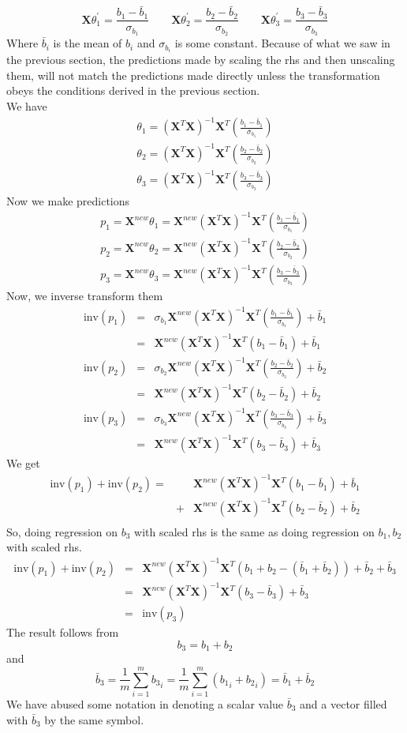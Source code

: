 \documentclass{article}
\newcommand{\beq}{\begin{equation}}
\newcommand{\eeq}{\end{equation}}
\newcommand{\ber}{\begin{eqnarray}}
\newcommand{\eer}{\end{eqnarray}}
\begin{document}
\beq
\pmb{X}\theta_1^{'}=\frac{b_1-\bar{b}_1}{\sigma_{b_1}} \qquad \pmb{X}\theta_2^{'}=\frac{b_2-\bar{b}_2}{\sigma_{b_2}} \qquad \pmb{X}\theta_3^{'}=\frac{b_3-\bar{b}_3}{\sigma_{b_3}}
\eeq
Where $\bar{b}_i$ is the mean of $b_i$ and $\sigma_{b_i}$ is some constant. Because of what we saw in the previous section, the predictions made by scaling the rhs and then unscaling them, will not match the predictions made directly unless the transformation obeys the conditions derived in the previous section.\\
We have
\ber
\theta_1 = (\pmb{X}^T\pmb{X})^{-1}\pmb{X}^T (\frac{b_1-\bar{b}_1}{\sigma_{b_1}})\\
\theta_2 = (\pmb{X}^T\pmb{X})^{-1}\pmb{X}^T (\frac{b_2-\bar{b}_2}{\sigma_{b_2}})\\
\theta_3 = (\pmb{X}^T\pmb{X})^{-1}\pmb{X}^T (\frac{b_3-\bar{b}_3}{\sigma_{b_3}})
\eer
Now we make predictions
\ber
p_1 = \pmb{X}^{new}\theta_1 = \pmb{X}^{new}(\pmb{X}^T\pmb{X})^{-1}\pmb{X}^T (\frac{b_1-\bar{b}_1}{\sigma_{b_1}})\\
p_2 = \pmb{X}^{new}\theta_2 = \pmb{X}^{new}(\pmb{X}^T\pmb{X})^{-1}\pmb{X}^T (\frac{b_2-\bar{b}_2}{\sigma_{b_2}})\\
p_3 = \pmb{X}^{new}\theta_3 = \pmb{X}^{new}(\pmb{X}^T\pmb{X})^{-1}\pmb{X}^T (\frac{b_3-\bar{b}_3}{\sigma_{b_3}})
\eer
Now, we inverse transform them
\ber
\text{inv}(p_1) &=& \sigma_{b_1}\pmb{X}^{new}(\pmb{X}^T\pmb{X})^{-1}\pmb{X}^T (\frac{b_1-\bar{b}_1}{\sigma_{b_1}}) + \bar{b}_1\\
&=& \pmb{X}^{new}(\pmb{X}^T\pmb{X})^{-1}\pmb{X}^T (b_1-\bar{b}_1) + \bar{b}_1 \\
%
\text{inv}(p_2) &=& \sigma_{b_2}\pmb{X}^{new}(\pmb{X}^T\pmb{X})^{-1}\pmb{X}^T (\frac{b_2-\bar{b}_2}{\sigma_{b_2}}) + \bar{b}_2\\
&=& \pmb{X}^{new}(\pmb{X}^T\pmb{X})^{-1}\pmb{X}^T (b_2-\bar{b}_2) + \bar{b}_2\\
\text{inv}(p_3) &=& \sigma_{b_3}\pmb{X}^{new}(\pmb{X}^T\pmb{X})^{-1}\pmb{X}^T (\frac{b_3-\bar{b}_3}{\sigma_{b_3}}) + \bar{b}_3\\
&=& \pmb{X}^{new}(\pmb{X}^T\pmb{X})^{-1}\pmb{X}^T (b_3-\bar{b}_3) + \bar{b}_3 
\eer
We get
\ber
\text{inv}(p_1) + \text{inv}(p_2) = & & \pmb{X}^{new}(\pmb{X}^T\pmb{X})^{-1}\pmb{X}^T (b_1-\bar{b}_1) + \bar{b}_1 \\ &+&  \pmb{X}^{new}(\pmb{X}^T\pmb{X})^{-1}\pmb{X}^T (b_2-\bar{b}_2) + \bar{b}_2 \\
\eer
So, doing regression on $b_3$ with scaled rhs is the same as doing regression on $b_1,b_2$ with scaled rhs.
\ber
\text{inv}(p_1) + \text{inv}(p_2) &=& \pmb{X}^{new}(\pmb{X}^T\pmb{X})^{-1}\pmb{X}^T(b_1+b_2-(\bar{b}_1 + \bar{b}_2)) + \bar{b}_2 + \bar{b}_3 \\
&=& \pmb{X}^{new}(\pmb{X}^T\pmb{X})^{-1}\pmb{X}^T(b_3 - \bar{b}_3) + \bar{b}_3 \\
&=& \text{inv}(p_3)
\eer
The result follows from
\beq
b_3 = b_1 + b_2
\eeq
and
\beq
\bar{b}_3 = \frac{1}{m}\sum_{i=1}^{m} {{}{b}_3}_i = \frac{1}{m}\sum_{i=1}^{m} ({{}{b}_1}_i+{{}{b}_2}_i) = \bar{b}_1 + \bar{b}_2
\eeq
We have abused some notation in denoting a scalar value $\bar{b}_3$ and a vector filled with $\bar{b}_3$ by the same symbol.
\end{document}

